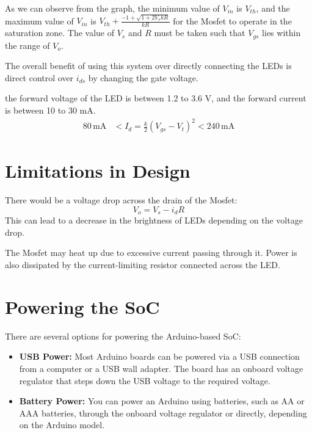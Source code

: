 \documentclass{article}
\begin{document}
As we can observe from the graph, the minimum value of \(V_{in}\) is \(V_{th}\), and the maximum value of \(V_{in}\) is \(V_{th} + \frac{-1 + \sqrt{1 + 2V_s kR}}{kR}\) for the Mosfet to operate in the saturation zone. The value of \(V_s\) and \(R\) must be taken such that \(V_{gs}\) lies within the range of \(V_o\).

The overall benefit of using this system over directly connecting the LEDs is direct control over \(i_{ds}\) by changing the gate voltage.

the forward voltage of the LED is between 1.2 to 3.6 V, and the forward current is between 10 to 30 mA.
\begin{align}
80\,\text{mA} & < I_d = \frac{k}{2} (V_{gs} - V_t)^2 < 240\,\text{mA}
\end{align}
\section{Limitations in Design}
There would be a voltage drop across the drain of the Mosfet:
\[
V_{o} = V_{s} - i_{d}R
\]
This can lead to a decrease in the brightness of LEDs depending on the voltage drop.

The Mosfet may heat up due to excessive current passing through it. Power is also dissipated by the current-limiting resistor connected across the LED.

\section{Powering the SoC}
There are several options for powering the Arduino-based SoC:

\begin{itemize}
  \item \textbf{USB Power:} Most Arduino boards can be powered via a USB connection from a computer or a USB wall adapter. The board has an onboard voltage regulator that steps down the USB voltage to the required voltage.
  
  \item \textbf{Battery Power:} You can power an Arduino using batteries, such as AA or AAA batteries, through the onboard voltage regulator or directly, depending on the Arduino model.
\end{itemize}
\end{document}
